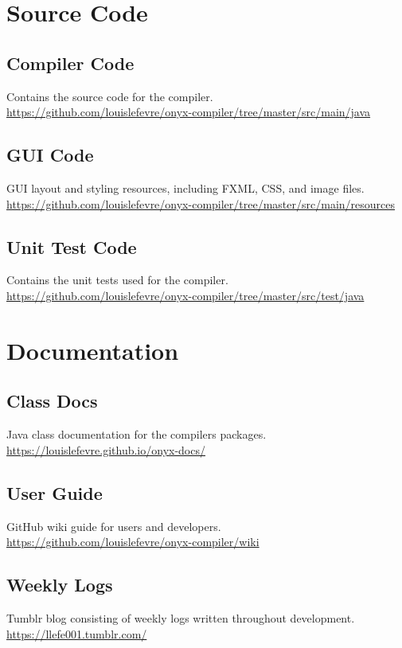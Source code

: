 \documentclass[
]{report}
\begin{document}
\begin{appendices}
	\chapter{Source Code}
	\section{Compiler Code}
	\label{appendix:compiler-code}
	Contains the source code for the compiler.\\
	\url{https://github.com/louislefevre/onyx-compiler/tree/master/src/main/java}
	\section{GUI Code}
	\label{appendix:gui-code}
	GUI layout and styling resources, including FXML, CSS, and image files.\\
	\url{https://github.com/louislefevre/onyx-compiler/tree/master/src/main/resources}
	\section{Unit Test Code}
	\label{appendix:unit-test-code}
	Contains the unit tests used for the compiler.\\
	\url{https://github.com/louislefevre/onyx-compiler/tree/master/src/test/java}

	\chapter{Documentation}
	\section{Class Docs}
	\label{appendix:class-docs}
	Java class documentation for the compilers packages.\\
	\url{https://louislefevre.github.io/onyx-docs/}
	\section{User Guide}
	\label{appendix:user-guide}
	GitHub wiki guide for users and developers.\\
	\url{https://github.com/louislefevre/onyx-compiler/wiki}
	\section{Weekly Logs}
	\label{appendix:weekly-logs}
	Tumblr blog consisting of weekly logs written throughout development.\\
	\url{https://llefe001.tumblr.com/}

\end{appendices}
\end{document}
